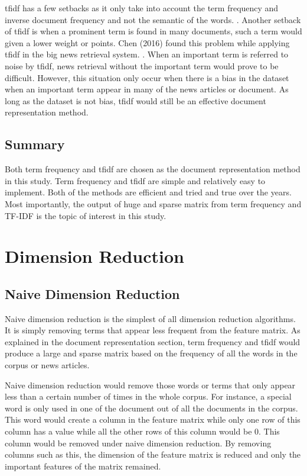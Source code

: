 \Ac{tfidf} has a few setbacks as it only take into account the term frequency and inverse document frequency and not the semantic of the words. \cite{tfidfDrawback}. Another setback of \ac{tfidf} is when a prominent term is found in many documents, such a term would given a lower weight or points. Chen (2016) found this problem while applying \ac{tfidf} in the big news retrieval system. \cite{improvedtfidf}. When an important term is referred to noise by \ac{tfidf}, news retrieval without the important term would prove to be difficult. However, this situation only occur when there is a bias in the dataset when an important term appear in many of the news articles or document. As long as the dataset is not bias, \ac{tfidf} would still be an effective document representation method.\\

\subsection{Summary}
Both term frequency and \ac{tfidf} are chosen as the document representation method in this study. Term frequency and \ac{tfidf} are simple and relatively easy to implement. Both of the methods are efficient and tried and true over the years. Most importantly, the output of huge and sparse matrix from term frequency and TF-IDF is the topic of interest in this study.


\section{Dimension Reduction}
\subsection{Naive Dimension Reduction}
Naive dimension reduction is the simplest of all dimension reduction algorithms. It is simply removing terms that appear less frequent from the feature matrix. As explained in the document representation section, term frequency and \ac{tfidf} would produce a large and sparse matrix based on the frequency of all the words in the corpus or news articles. 

Naive dimension reduction would remove those words or terms that only appear less than a certain number of times in the whole corpus. For instance, a special word is only used in one of the document out of all the documents in the corpus. This word would create a column in the feature matrix while only one row of this column has a value while all the other rows of this column would be 0. This column would be removed under naive dimension reduction. By removing columns such as this, the dimension of the feature matrix is reduced and only the important features of the matrix remained.

